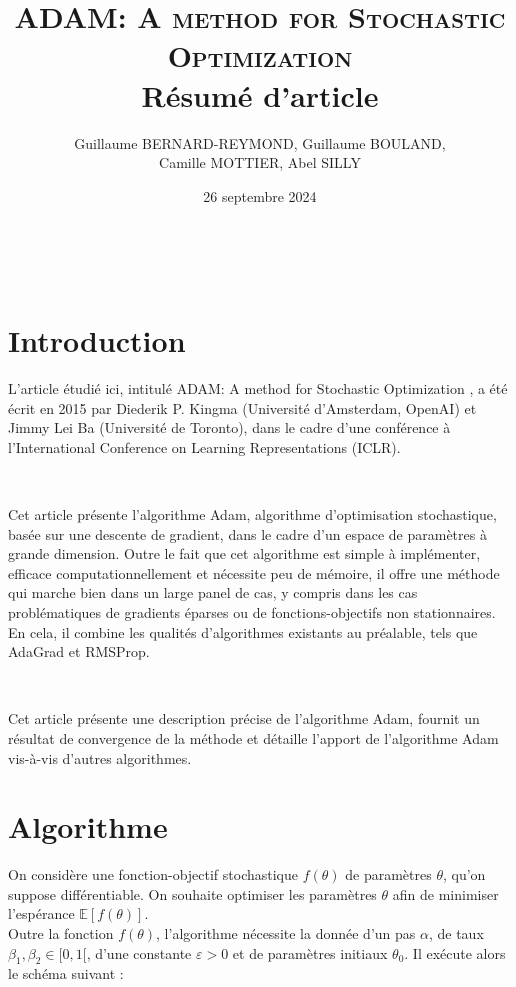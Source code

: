 \documentclass[11pt,a4paper, french]{article}
\title{\textsc{ADAM: A method for Stochastic Optimization}\\
Résumé d'article}
\author{Guillaume BERNARD-REYMOND, Guillaume BOULAND,\\ Camille MOTTIER, Abel SILLY}
\date{26 septembre 2024}
\theoremstyle{definition}
\begin{document}
\maketitle

\

\section{Introduction}

L'article étudié ici, intitulé \og ADAM: A method for Stochastic Optimization \fg{}, a été écrit en 2015 par Diederik P. Kingma (Université d'Amsterdam, OpenAI) et Jimmy Lei Ba (Université de Toronto), dans le cadre d'une conférence à l'International Conference on Learning Representations (ICLR). 

\

Cet article présente l'algorithme Adam, algorithme d'optimisation stochastique, basée sur une descente de gradient, dans le cadre d'un espace de paramètres à grande dimension.
Outre le fait que cet algorithme est simple à implémenter, efficace computationnellement et nécessite peu de mémoire, il offre une méthode qui marche bien dans un large panel de cas, y compris dans les cas problématiques de gradients éparses ou de fonctions-objectifs non stationnaires. En cela, il combine les qualités d'algorithmes existants au préalable, tels que AdaGrad et RMSProp.

\

Cet article présente une description précise de l'algorithme Adam, fournit un résultat de convergence de la méthode et détaille l'apport de l'algorithme Adam vis-à-vis d'autres algorithmes. 



\section{Algorithme}

On considère une fonction-objectif stochastique $f(\theta)$ de paramètres $\theta$, qu'on suppose différentiable. On souhaite optimiser les paramètres $\theta$ afin de minimiser l'espérance $\mathbb E[f(\theta)]$. \\
Outre la fonction $f(\theta)$, l'algorithme nécessite la donnée d'un pas $\alpha$, de taux $\beta_1,\beta_2\in[0,1[$, d'une constante $\varepsilon>0$ et de paramètres initiaux $\theta_0$. Il exécute alors le schéma suivant :
\end{document}

